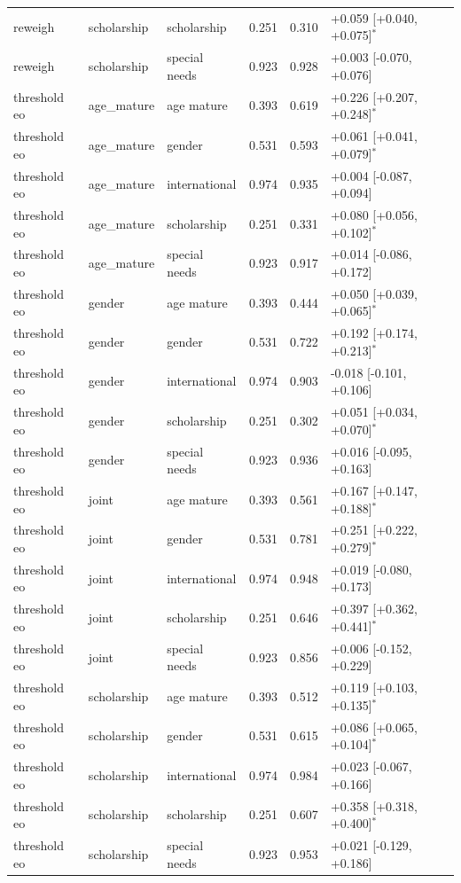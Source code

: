 \begin{table}[t]
\begin{tabular}{lllrrl}
reweigh & scholarship & scholarship & 0.251 & 0.310 & +0.059 [+0.040, +0.075]$^{*}$ \\
reweigh & scholarship & special needs & 0.923 & 0.928 & +0.003 [-0.070, +0.076] \\
threshold eo & age_mature & age mature & 0.393 & 0.619 & +0.226 [+0.207, +0.248]$^{*}$ \\
threshold eo & age_mature & gender & 0.531 & 0.593 & +0.061 [+0.041, +0.079]$^{*}$ \\
threshold eo & age_mature & international & 0.974 & 0.935 & +0.004 [-0.087, +0.094] \\
threshold eo & age_mature & scholarship & 0.251 & 0.331 & +0.080 [+0.056, +0.102]$^{*}$ \\
threshold eo & age_mature & special needs & 0.923 & 0.917 & +0.014 [-0.086, +0.172] \\
threshold eo & gender & age mature & 0.393 & 0.444 & +0.050 [+0.039, +0.065]$^{*}$ \\
threshold eo & gender & gender & 0.531 & 0.722 & +0.192 [+0.174, +0.213]$^{*}$ \\
threshold eo & gender & international & 0.974 & 0.903 & -0.018 [-0.101, +0.106] \\
threshold eo & gender & scholarship & 0.251 & 0.302 & +0.051 [+0.034, +0.070]$^{*}$ \\
threshold eo & gender & special needs & 0.923 & 0.936 & +0.016 [-0.095, +0.163] \\
threshold eo & joint & age mature & 0.393 & 0.561 & +0.167 [+0.147, +0.188]$^{*}$ \\
threshold eo & joint & gender & 0.531 & 0.781 & +0.251 [+0.222, +0.279]$^{*}$ \\
threshold eo & joint & international & 0.974 & 0.948 & +0.019 [-0.080, +0.173] \\
threshold eo & joint & scholarship & 0.251 & 0.646 & +0.397 [+0.362, +0.441]$^{*}$ \\
threshold eo & joint & special needs & 0.923 & 0.856 & +0.006 [-0.152, +0.229] \\
threshold eo & scholarship & age mature & 0.393 & 0.512 & +0.119 [+0.103, +0.135]$^{*}$ \\
threshold eo & scholarship & gender & 0.531 & 0.615 & +0.086 [+0.065, +0.104]$^{*}$ \\
threshold eo & scholarship & international & 0.974 & 0.984 & +0.023 [-0.067, +0.166] \\
threshold eo & scholarship & scholarship & 0.251 & 0.607 & +0.358 [+0.318, +0.400]$^{*}$ \\
threshold eo & scholarship & special needs & 0.923 & 0.953 & +0.021 [-0.129, +0.186] \\
\bottomrule
\end{tabular}
\end{table}